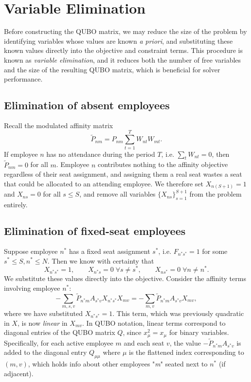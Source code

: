 \documentclass[10pt]{article}
\theoremstyle{definition}
\theoremstyle{plain}
\theoremstyle{remark}
\begin{document}
	\section{Variable Elimination}
	
	Before constructing the QUBO matrix, we may reduce the size of the problem by 
	identifying variables whose values are known \textit{a priori}, and substituting 
	these known values directly into the objective and constraint terms. This procedure 
	is known as \emph{variable elimination}, and it reduces both the number of free 
	variables and the size of the resulting QUBO matrix, which is beneficial for solver 
	performance.
	
	\subsection{Elimination of absent employees}
	
	Recall the modulated affinity matrix
	\begin{equation}
		\tilde{P}_{nm} = P_{nm} \sum_{t=1}^{T} W_{nt} W_{mt}.
	\end{equation}
	If employee $n$ has no attendance during the period $T$, i.e. $\sum_t W_{nt} = 0$, 
	then $\tilde{P}_{nm} = 0$ for all $m$. Employee $n$ contributes nothing to the 
	affinity objective regardless of their seat assignment, and assigning them a real 
	seat wastes a seat that could be allocated to an attending employee. We therefore 
	set $X_{n(S+1)} = 1$ and $X_{ns} = 0$ for all $s \leq S$, and remove all variables 
	$\{X_{ns}\}_{s=1}^{S+1}$ from the problem entirely.
	
	\subsection{Elimination of fixed-seat employees}
	
	Suppose employee $n^*$ has a fixed seat assignment $s^*$, i.e. $F_{n^* s^*} = 1$ for some 
	$s^* \leq S, n^* \leq N$. Then we know with certainty that
	\begin{equation}
		X_{n^* s^*} = 1, \qquad X_{n^* s} = 0 \;\forall s \neq s^*, \qquad 
		X_{n s^*} = 0 \;\forall n \neq n^*.
	\end{equation}
	We substitute these values directly into the objective. Consider the affinity terms 
	involving employee $n^*$:
	\begin{equation}
		-\sum_{m, s, v} \tilde{P}_{n^* m} A_{s^* v} X_{n^* s^*} X_{m v} 
		= -\sum_{m, v} \tilde{P}_{n^* m} A_{s^* v} X_{m v},
	\end{equation}
	where we have substituted $X_{n^* s^*} = 1$. This term, which was previously 
	quadratic in $X$, is now \emph{linear} in $X_{mv}$. In QUBO notation, linear 
	terms correspond to diagonal entries of the QUBO matrix $Q$, since 
	$x_\mu^2 = x_\mu$ for binary variables. Specifically, for each active employee $m$ 
	and each seat $v$, the value $-\tilde{P}_{n^* m} A_{s^* v}$ is added to the 
	diagonal entry $Q_{\mu\mu}$ where $\mu$ is the flattened index corresponding to 
	$(m, v)$, which holds info about other employees "\textit{m}" seated next to $n^*$ (if adjacent).
	
\end{document}

